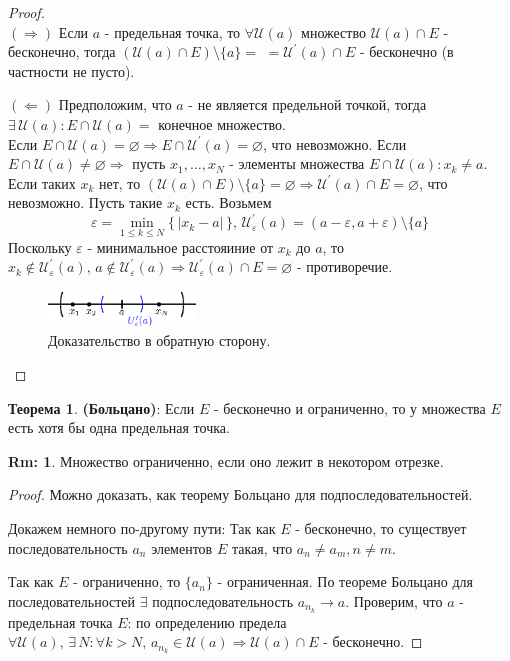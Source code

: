 \documentclass[12pt]{article}
\theoremstyle{definition}
\newtheorem{rem}{Rm:}
\newtheorem{theorem}{Теорема}
\begin{document}
\begin{proof}\hfill\\
	$(\Rightarrow)$ Если $a$ - предельная точка, то $\forall \mathcal{U}(a)$ множество $\mathcal{U}(a) \cap E$ - бесконечно, тогда $(\mathcal{U}(a) \cap E) \setminus \{a\} = $ $= \mathcal{U}^\prime(a) \cap E$ - бесконечно (в частности не пусто).
	
	$(\Leftarrow)$ Предположим, что $a$ - не является предельной точкой, тогда $\exists \, \mathcal{U}(a) \colon E \cap \mathcal{U}(a) = $ конечное множество. \\
	Если $E \cap \mathcal{U}(a) = \varnothing \Rightarrow E \cap \mathcal{U}^\prime(a) = \varnothing$, что невозможно. Если $E \cap \mathcal{U}(a) \neq \varnothing \Rightarrow$ пусть $x_1, \dotsc, x_N$ - элементы множества $E \cap \mathcal{U}(a) \colon x_k \neq a$. Если таких $x_k$ нет, то $(\mathcal{U}(a) \cap E) \setminus \{a\} = \varnothing \Rightarrow \mathcal{U}^\prime(a) \cap E = \varnothing$, что невозможно. Пусть такие $x_k$ есть. Возьмем $$\varepsilon = \underset{1 \leq k \leq N}{\min} \{\,|x_k -a| \,\}, \, \mathcal{U}^{\prime}_{\varepsilon}(a) = (a-\varepsilon, a + \varepsilon) \setminus \{a\}$$
	Поскольку $\varepsilon$ - минимальное расстояиние от $x_k$ до $a$, то $x_k \notin  \mathcal{U}^{\prime}_{\varepsilon}(a), \, a \notin  \mathcal{U}^{\prime}_{\varepsilon}(a) \Rightarrow  \mathcal{U}^{\prime}_{\varepsilon}(a) \cap E = \varnothing$ - противоречие.
	
		
	\begin{figure}[H]
		\centering
		\includegraphics[width=0.35\textwidth]{12_3.eps}
		\caption{Доказательство в обратную сторону.}
		\label{12_3}
	\end{figure}
	
\end{proof}

\begin{theorem}\textbf{(Больцано)}: 
	Если $E$ - бесконечно и ограниченно, то у множества $E$ есть хотя бы одна предельная точка.	
\end{theorem}

\begin{rem}
	Множество ограниченно, если оно лежит в некотором отрезке.
\end{rem}

\begin{proof}
	Можно доказать, как теорему Больцано для подпоследовательностей. 
	
	Докажем немного по-другому пути: Так как $E$ - бесконечно, то существует последовательность $a_n$ элементов $E$ такая, что $a_n \neq a_m, n \neq m$.	
	
	Так как $E$ - ограниченно, то $\{a_n\}$ - ограниченная. По теореме Больцано для последовательностей $\exists$ подпоследовательность $a_{n_k}\! \rightarrow a$.
	Проверим, что $a$ - предельная точка $E$: по определению предела $\forall \mathcal{U}(a), \, \exists \, N \colon \forall k > N, \, a_{n_k} \in \mathcal{U}(a) \Rightarrow \mathcal{U}(a) \cap E$ - бесконечно.
\end{proof}
\end{document}
